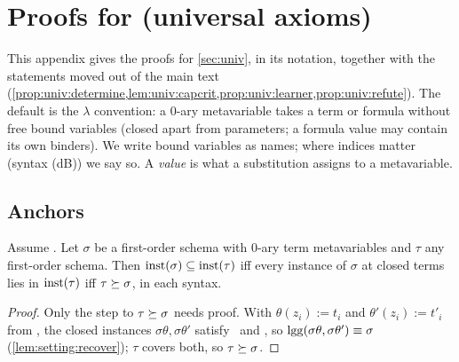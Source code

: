 
\section{Proofs for \texorpdfstring{}{the section on universal axioms} (universal axioms)}\label{app:univ}

This appendix gives the proofs for \cref{sec:univ}, in its notation, together with the statements moved out of the main text (\cref{prop:univ:determine,lem:univ:capcrit,prop:univ:learner,prop:univ:refute}). The default is the $\lambda$ convention: a $0$-ary metavariable takes a term or formula without free bound variables (closed apart from parameters; a formula value may contain its own binders). We write bound variables as names; where indices matter (syntax (dB)) we say so. A \emph{value} is what a substitution assigns to a metavariable.

\subsection{Anchors}\label{app:univ:anchor}

\begin{proposition}\label{prop:univ:determine}
Assume \univRich. Let $\sigma$ be a first-order schema with $0$-ary term metavariables and $\tau$ any first-order schema. Then $\mathrm{inst}(\sigma)\subseteq\mathrm{inst}(\tau)$ iff every instance of $\sigma$ at closed terms lies in $\mathrm{inst}(\tau)$ iff $\tau\succeq\sigma$, in each syntax.
\end{proposition}

\begin{proof}
Only the step to $\tau\succeq\sigma$ needs proof. With $\theta(z_i):=t_i$ and $\theta'(z_i):=t'_i$ from \univRich, the closed instances $\sigma\theta,\sigma\theta'$ satisfy \evR\ and \evD, so $\mathrm{lgg}(\sigma\theta,\sigma\theta')\equiv\sigma$ (\cref{lem:setting:recover}); $\tau$ covers both, so $\tau\succeq\sigma$.
\end{proof}

